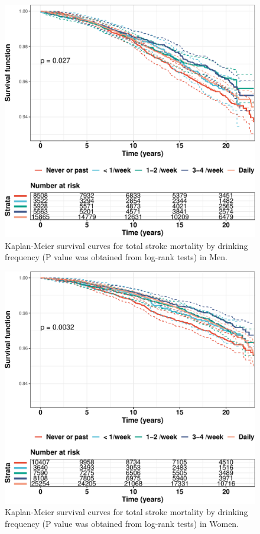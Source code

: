 \documentclass[]{article}
\begin{document}
\begin{figure}

{\centering \includegraphics[width=1\linewidth]{traditionalPH_files/figure-latex/fig1-1} 

}

\caption{Kaplan-Meier survival curves for total stroke mortality by drinking frequency (P value was obtained from log-rank tests) in Men.}\label{fig:fig1}
\end{figure}
\begin{figure}

{\centering \includegraphics[width=1\linewidth]{traditionalPH_files/figure-latex/fig2-1} 

}

\caption{Kaplan-Meier survival curves for total stroke mortality by drinking frequency (P value was obtained from log-rank tests) in Women.}\label{fig:fig2}
\end{figure}
\end{document}
